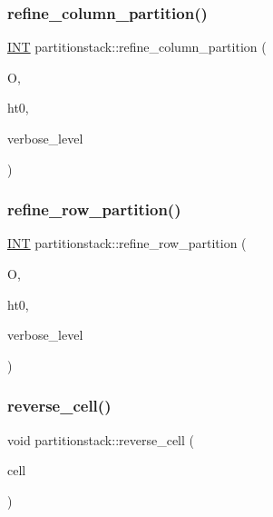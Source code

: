 \subsubsection{\texorpdfstring{refine\+\_\+column\+\_\+partition()}{refine\_column\_partition()}}
{\footnotesize\ttfamily \mbox{\hyperlink{galois_8h_a09fddde158a3a20bd2dcadb609de11dc}{I\+NT}} partitionstack\+::refine\+\_\+column\+\_\+partition (\begin{DoxyParamCaption}\item[{\mbox{\hyperlink{classorthogonal}{orthogonal}} \&}]{O,  }\item[{\mbox{\hyperlink{galois_8h_a09fddde158a3a20bd2dcadb609de11dc}{I\+NT}}}]{ht0,  }\item[{\mbox{\hyperlink{galois_8h_a09fddde158a3a20bd2dcadb609de11dc}{I\+NT}}}]{verbose\+\_\+level }\end{DoxyParamCaption})}

\mbox{\label{classpartitionstack_aa52dc8b86c34cf2455733e58e4f0e9e0}} 
\subsubsection{\texorpdfstring{refine\+\_\+row\+\_\+partition()}{refine\_row\_partition()}}
{\footnotesize\ttfamily \mbox{\hyperlink{galois_8h_a09fddde158a3a20bd2dcadb609de11dc}{I\+NT}} partitionstack\+::refine\+\_\+row\+\_\+partition (\begin{DoxyParamCaption}\item[{\mbox{\hyperlink{classorthogonal}{orthogonal}} \&}]{O,  }\item[{\mbox{\hyperlink{galois_8h_a09fddde158a3a20bd2dcadb609de11dc}{I\+NT}}}]{ht0,  }\item[{\mbox{\hyperlink{galois_8h_a09fddde158a3a20bd2dcadb609de11dc}{I\+NT}}}]{verbose\+\_\+level }\end{DoxyParamCaption})}

\mbox{\label{classpartitionstack_a870ecfafbc50b6ae48e3fab862e4b226}} 
\subsubsection{\texorpdfstring{reverse\+\_\+cell()}{reverse\_cell()}}
{\footnotesize\ttfamily void partitionstack\+::reverse\+\_\+cell (\begin{DoxyParamCaption}\item[{\mbox{\hyperlink{galois_8h_a09fddde158a3a20bd2dcadb609de11dc}{I\+NT}}}]{cell }\end{DoxyParamCaption})}

